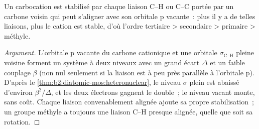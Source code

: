 \begin{proposition}\label{prop:b2:fragment-orbitals:hyperconjugation}
Un carbocation est stabilisé par chaque liaison C--H ou C--C portée par un carbone voisin
qui peut s'aligner avec son orbitale p vacante~: plus il y a de telles liaisons, plus le
cation est stable, d'où l'ordre tertiaire > secondaire > primaire > méthyle.
\end{proposition}

\begin{proof}[Argument]
L'orbitale p vacante du carbone cationique et une orbitale $\sigma_{\text{C--H}}$ pleine
voisine forment un système à deux niveaux avec un grand écart $\Delta$ et un faible couplage
$\beta$ (non nul seulement si la liaison est à peu près parallèle à l'orbitale p). D'après le
\cref{thm:b2:diatomic-mos:heteronuclear}, le niveau $\sigma$ plein est abaissé d'environ
$\beta^2/\Delta$, et les deux électrons gagnent le double~; le niveau vacant monte, sans
coût. Chaque liaison convenablement alignée ajoute sa propre stabilisation~; un groupe méthyle
a toujours une liaison C--H presque alignée, quelle que soit sa rotation.
\end{proof}

